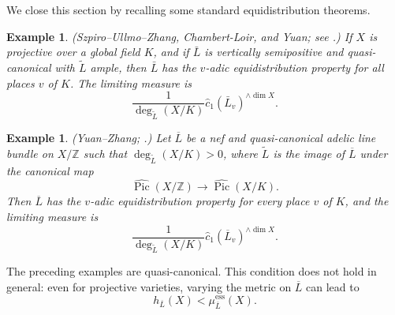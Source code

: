 \documentclass[10pt,a4paper]{amsart}
\theoremstyle{plain}
\newtheorem{example}[theorem]{Example}
\theoremstyle{plain}
\numberwithin{equation}{section}
\begin{document}
We close this section by recalling some standard equidistribution theorems.
\begin{example}
	(Szpiro--Ullmo--Zhang, Chambert-Loir, and Yuan; see \cite{SUZ,CL2,Yua1}.)  If \(X\) is projective
	over a global field \(K\), and if \(\bar L\) is vertically semipositive
	and quasi-canonical with \(\widetilde L\) ample, then \(\bar L\) has the
	\(v\)-adic equidistribution property for all places \(v\) of \(K\).  The
	limiting measure is
	\[
	\frac{1}{\deg_{\widetilde{L}}(X/K)}
	\hat{c}_1(\bar{L}_v)^{\wedge{\dim X}}.
	\]
\end{example}
\begin{example}
	(Yuan--Zhang; \cite[Theorem~5.4.3]{YZ}.)  Let \(\overline L\) be a nef and quasi-canonical adelic line bundle on
	\(X/\mathbb Z\) such that \(\deg_{\widetilde L}(X/K)>0\), where
	\(\widetilde L\) is the image of \(\overline L\) under the canonical map
	\[
	\widehat{\operatorname{Pic}}(X/\mathbb Z)\to
	\widehat{\operatorname{Pic}}(X/K).
	\]
	Then \(\overline L\) has the \(v\)-adic equidistribution property for every
	place \(v\) of \(K\), and the limiting measure is
	\[
	\frac{1}{\deg_{\widetilde{L}}(X/K)}
	\hat{c}_1(\overline{L}_v)^{\wedge{\dim X}} .
	\]
\end{example}
The preceding examples are quasi-canonical.  This condition does not hold in
general: even for projective varieties, varying the metric on \(\overline L\)
can lead to
\[
h_{\overline{L}}(X)<\mu^{\mathrm{ess}}_{\overline{L}}(X).
\]
\end{document}
